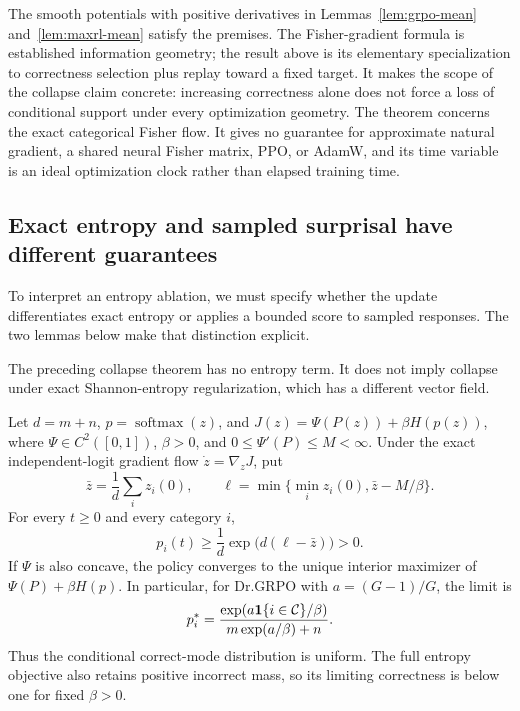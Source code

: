 The smooth potentials with positive derivatives in
Lemmas~\ref{lem:grpo-mean} and~\ref{lem:maxrl-mean} satisfy the premises. The Fisher-gradient formula
is established information geometry; the result above is its elementary
specialization to correctness selection plus replay toward a fixed target.
It makes the scope of the collapse claim concrete: increasing correctness
alone does not force a loss of conditional support under every optimization
geometry. The theorem concerns the exact categorical Fisher flow. It gives
no guarantee for approximate natural gradient, a shared neural Fisher
matrix, PPO, or AdamW, and its time variable is an ideal optimization clock
rather than elapsed training time.

\subsection{Exact entropy and sampled surprisal have different guarantees}
\label{app:theory-entropy}


To interpret an entropy ablation, we must specify whether the update
differentiates exact entropy or applies a bounded score to sampled responses.
The two lemmas below make that distinction explicit.

The preceding collapse theorem has no entropy term. It does not imply collapse
under exact Shannon-entropy regularization, which has a different vector field.

\begin{lemma}
\label{lem:entropy-scope}
Let $d=m+n$, $p=\operatorname{softmax}(z)$, and
$J(z)=\Psi(P(z))+\beta H(p(z))$, where $\Psi\in C^2([0,1])$, $\beta>0$, and
$0\le\Psi'(P)\le M<\infty$. Under the exact independent-logit gradient flow
$\dot z=\nabla_zJ$, put
\[
 \bar z=\frac1d\sum_i z_i(0),\qquad
 \ell=\min\{\min_i z_i(0),\bar z-M/\beta\}.
\]
For every $t\ge0$ and every category $i$,
\[
 p_i(t)\ge \frac1d\exp\!\bigl(d(\ell-\bar z)\bigr)>0.
\]
If $\Psi$ is also concave, the policy
converges to the unique interior maximizer of $\Psi(P)+\beta H(p)$.
In particular, for Dr.GRPO with $a=(G-1)/G$, the limit is
\[
 p_i^*=\frac{\exp(a\mathbf 1\{i\in\mathcal C\}/\beta)}
 {m\exp(a/\beta)+n}.
\]
Thus the conditional correct-mode distribution is uniform. The full entropy
objective also retains positive incorrect mass, so its limiting correctness
is below one for fixed $\beta>0$.
\end{lemma}

